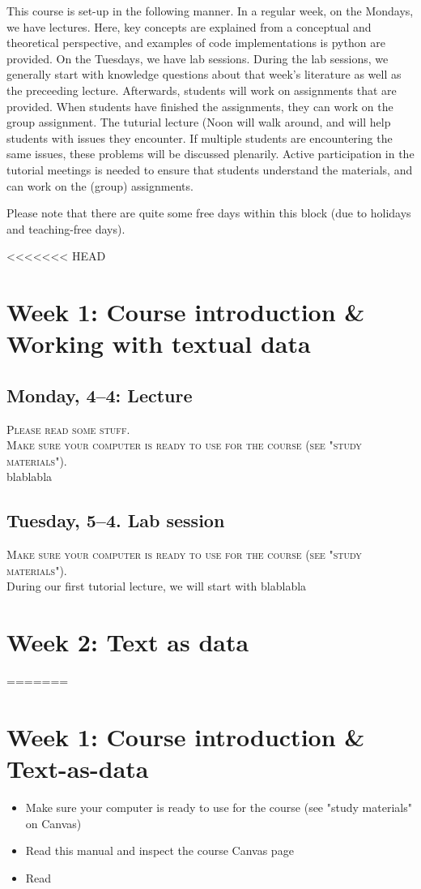 

This course is set-up in the following manner. In a regular week, on the Mondays, we have lectures. Here, key concepts are explained from a conceptual and theoretical perspective, and examples of code implementations is python are provided.  On the Tuesdays, we have lab sessions. During the lab sessions, we generally start with knowledge questions about that week's literature as well as the preceeding lecture. Afterwards, students will work on assignments that are provided. When students have finished the assignments, they can work on the group assignment. The tuturial lecture (Noon will walk around, and will help students with issues they encounter. If multiple students are encountering the same issues, these problems will be discussed plenarily. Active participation in the tutorial meetings is needed to ensure that students understand the materials, and can work on the (group) assignments.

Please note that there are quite some free days within this block (due to holidays and teaching-free days).

<<<<<<< HEAD

\section*{Week 1: Course introduction \& Working with textual data}


\subsection*{Monday, 4--4: Lecture}
\textsc{ Please read some stuff.}\\
\textsc{ Make sure your computer is ready to use for the course (see "study materials").}\\
blablabla

\subsection*{Tuesday, 5--4. Lab session}
\textsc{ Make sure your computer is ready to use for the course (see "study materials").}\\
During our first tutorial lecture, we will start with blablabla

\section*{Week 2: Text as data}
=======
\section*{Week 1: Course introduction \& Text-as-data}
\begin{itemize}
	\item{Make sure your computer is ready to use for the course (see "study materials" on Canvas)}
	\item{Read this manual and inspect the course Canvas page}
	\item{Read \cite{boumans_taking_2016}}
\end{itemize}

